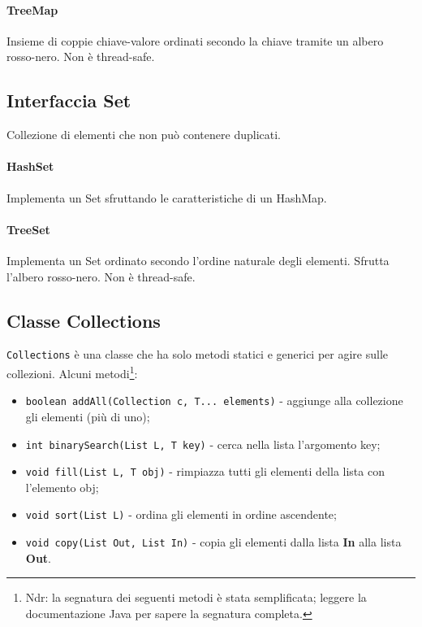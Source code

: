\paragraph{TreeMap}
Insieme di coppie chiave-valore ordinati secondo la chiave tramite un albero rosso-nero. Non è thread-safe. 

\subsection{Interfaccia Set}
Collezione di elementi che non può contenere duplicati.

\paragraph{HashSet}
Implementa un Set sfruttando le caratteristiche di un HashMap.


\paragraph{TreeSet}
Implementa un Set ordinato secondo l'ordine naturale degli elementi. Sfrutta l'albero rosso-nero. Non è thread-safe.


\subsection{Classe Collections}
\texttt{Collections} è una classe che ha solo metodi statici e generici per agire sulle collezioni. Alcuni metodi\footnote{Ndr: la segnatura dei seguenti metodi è stata semplificata; leggere la documentazione Java per sapere la segnatura completa.}:
\begin{itemize}
\item \texttt{boolean addAll(Collection c, T... elements)} - aggiunge alla collezione gli elementi (più di uno);
\item \texttt{int binarySearch(List L, T key)} - cerca nella lista l'argomento key; 
\item \texttt{void fill(List L, T obj)} - rimpiazza tutti gli elementi della lista con l'elemento obj;
\item \texttt{void sort(List L)} - ordina gli elementi in ordine ascendente;
\item \texttt{void copy(List Out, List In)} - copia gli elementi dalla lista \textbf{In} alla lista \textbf{Out}.
\end{itemize}


